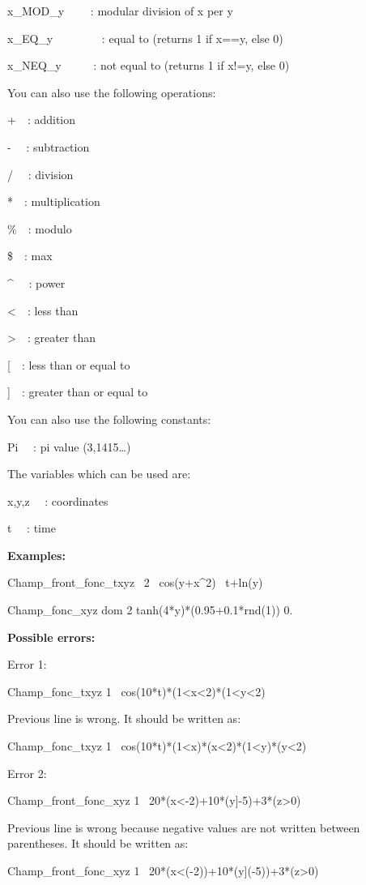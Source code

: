 x\_MOD\_y \ \ \ \ : modular division of x per y

x\_EQ\_y \ \ \ \ \ \ \ \ : equal to (returns 1 if x==y, else 0)

x\_NEQ\_y \ \ \ \ \ : not equal to (returns 1 if x!=y, else 0) 


\bigskip

You can also use the following operations:

+\ \ : addition

{}- \ \ : subtraction

/ \ \ : division

*\ \ : multiplication

\%\ \ : modulo

\$\ \ : max

\^{} \ \ : power

{\textless}\ \ : less than

{\textgreater}\ \ : greater than

[\ \ : less than or equal to

]\ \ : greater than or equal to


\bigskip

You can also use the following constants:

Pi \ \ : pi value (3,1415{\dots})


\bigskip

The variables which can be used are:

x,y,z \ \ : coordinates 

t \ \ : time


\bigskip

{\bfseries
Examples:}

Champ\_front\_fonc\_txyz \ 2 \ cos(y+x\^{}2) \ t+ln(y)

Champ\_fonc\_xyz dom 2 tanh(4*y)*(0.95+0.1*rnd(1)) 0.


\bigskip

{\bfseries
Possible errors:}

Error 1:

Champ\_fonc\_txyz 1 \ cos(10*t)*(1{\textless}x{\textless}2)*(1{\textless}y{\textless}2)

Previous line is wrong. It should be written as:

Champ\_fonc\_txyz 1 \ cos(10*t)*(1{\textless}x)*(x{\textless}2)*(1{\textless}y)*(y{\textless}2)

\bigskip
Error 2:

Champ\_front\_fonc\_xyz 1 \ 20*(x{\textless}-2)+10*(y]-5)+3*(z{\textgreater}0)

Previous line is wrong because negative values are not written between parentheses. It should be written as:

Champ\_front\_fonc\_xyz 1 \ 20*(x{\textless}(-2))+10*(y](-5))+3*(z{\textgreater}0)
